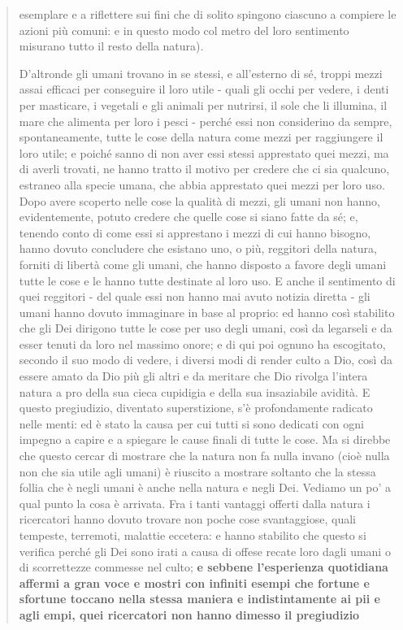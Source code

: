 \begin{quotation}
\begin{enumerate}
		esemplare e a riflettere sui fini che di solito spingono ciascuno a compiere le azioni più comuni: e in questo modo col metro del loro sentimento misurano tutto il resto della natura).
	\end{enumerate} 
	D’altronde gli umani trovano in se stessi, e all’esterno di sé, troppi mezzi assai efficaci per
	conseguire il loro utile - quali gli occhi per vedere, i denti per masticare, i vegetali e gli animali per nutrirsi, il sole che li illumina, il mare che alimenta per loro i pesci - perché essi
	non considerino da sempre, spontaneamente, tutte le cose della natura come mezzi per raggiungere il loro utile; e poiché sanno di non aver essi stessi apprestato quei mezzi, ma di
	averli trovati, ne hanno tratto il motivo per credere che ci sia qualcuno, estraneo alla specie umana, che abbia apprestato quei mezzi per loro uso. Dopo avere scoperto nelle cose la
	qualità di mezzi, gli umani non hanno, evidentemente, potuto credere che quelle cose si
	siano fatte da sé; e, tenendo conto di come essi si apprestano i mezzi di cui hanno bisogno,
	hanno dovuto concludere che esistano uno, o più, reggitori della natura, forniti di libertà
	come gli umani, che hanno disposto a favore degli umani tutte le cose e le hanno tutte destinate al loro uso. E anche il sentimento di quei reggitori - del quale essi non hanno mai
	avuto notizia diretta - gli umani hanno dovuto immaginare in base al proprio: ed hanno così stabilito che gli Dei dirigono tutte le cose per uso degli umani, così da legarseli e da esser
	tenuti da loro nel massimo onore; e di qui poi ognuno ha escogitato, secondo il suo modo
	di vedere, i diversi modi di render culto a Dio, così da essere amato da Dio più gli altri e da
	meritare che Dio rivolga l’intera natura a pro della sua cieca cupidigia e della sua insaziabile avidità. E questo pregiudizio, diventato superstizione, s’è profondamente radicato nelle
	menti: ed è stato la causa per cui tutti si sono dedicati con ogni impegno a capire e a spiegare le cause finali di tutte le cose. Ma si direbbe che questo cercar di mostrare che la natura
	non fa nulla invano (cioè nulla non che sia utile agli umani) è riuscito a mostrare soltanto
	che la stessa follia che è negli umani è anche nella natura e negli Dei. Vediamo un po’ a
	qual punto la cosa è arrivata. Fra i tanti vantaggi offerti dalla natura i ricercatori hanno dovuto trovare non poche cose svantaggiose, quali tempeste, terremoti, malattie eccetera: e
	hanno stabilito che questo si verifica perché gli Dei sono irati a causa di offese recate loro
	dagli umani o di scorrettezze commesse nel culto; \textbf{e sebbene l’esperienza quotidiana affermi a gran voce e mostri con infiniti esempi che fortune e sfortune toccano nella stessa maniera e indistintamente ai pii e agli empi, quei ricercatori non hanno dimesso il pregiudizio
}
\end{quotation}
